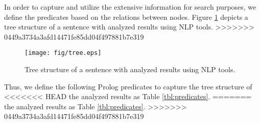 \documentclass[conference]{IEEEtran}
\begin{document}
In order to capture and utilize the extensive information for search purposes,
we define the predicates
based on the relations between nodes. Figure \ref{fig:tree} depicts a tree structure of
a sentence with analyzed results using NLP tools.
>>>>>>> 0449a3734a3afd14471fe85dd04f497881b7e319

\begin{figure}[htbp]
  \centerline{\texttt{[image: fig/tree.eps]}}
  \caption{Tree structure of a sentence with analyzed results using NLP tools.}
  \label{fig:tree}
\end{figure}

Thus, we define the following Prolog predicates to capture the tree structure of
<<<<<<< HEAD
the analyzed results as Table \ref{tbl:predicates}. 
=======
the analyzed results as Table \ref{tbl:predicates}.
>>>>>>> 0449a3734a3afd14471fe85dd04f497881b7e319
\end{document}
